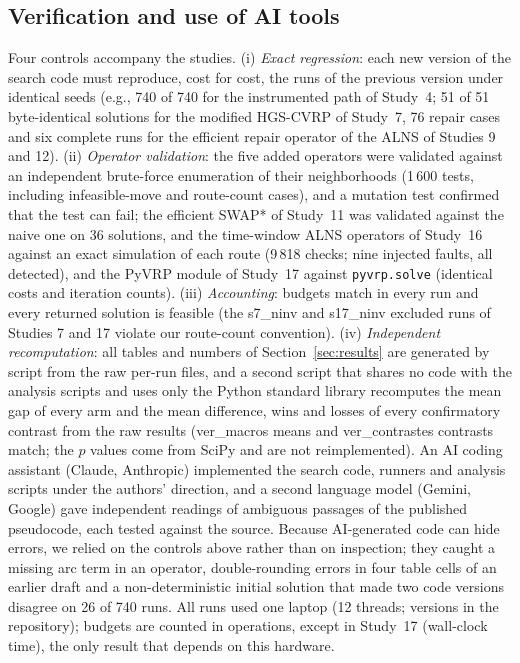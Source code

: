 \subsection{Verification and use of AI tools}\label{sec:verification}
Four controls accompany the studies. (i) \emph{Exact regression}: each new version of the search code must reproduce, cost for cost, the runs of the previous version under identical seeds (e.g., 740 of 740 for the instrumented path of Study~4; 51 of 51 byte-identical solutions for the modified HGS-CVRP of Study~7, 76 repair cases and six complete runs for the efficient repair operator of the ALNS of Studies 9 and 12). (ii) \emph{Operator validation}: the five added operators were validated against an independent brute-force enumeration of their neighborhoods (1\,600 tests, including infeasible-move and route-count cases), and a mutation test confirmed that the test can fail; the efficient SWAP* of Study~11 was validated against the naive one on 36 solutions, and the time-window ALNS operators of Study~16 against an exact simulation of each route (9\,818 checks; nine injected faults, all detected), and the PyVRP module of Study~17 against \texttt{pyvrp.solve} (identical costs and iteration counts). (iii) \emph{Accounting}: budgets match in every run and every returned solution is feasible (the \num{s7_ninv} and \num{s17_ninv} excluded runs of Studies 7 and 17 violate our route-count convention). (iv) \emph{Independent recomputation}: all tables and numbers of Section~\ref{sec:results} are generated by script from the raw per-run files, and a second script that shares no code with the analysis scripts and uses only the Python standard library recomputes the mean gap of every arm and the mean difference, wins and losses of every confirmatory contrast from the raw results (\num{ver_macros} means and \num{ver_contrastes} contrasts match; the $p$ values come from SciPy and are not reimplemented). An AI coding assistant (Claude, Anthropic) implemented the search code, runners and analysis scripts under the authors' direction, and a second language model (Gemini, Google) gave independent readings of ambiguous passages of the published pseudocode, each tested against the source. Because AI-generated code can hide errors, we relied on the controls above rather than on inspection; they caught a missing arc term in an operator, double-rounding errors in four table cells of an earlier draft and a non-deterministic initial solution that made two code versions disagree on 26 of 740 runs. All runs used one laptop (12 threads; versions in the repository); budgets are counted in operations, except in Study~17 (wall-clock time), the only result that depends on this hardware.
